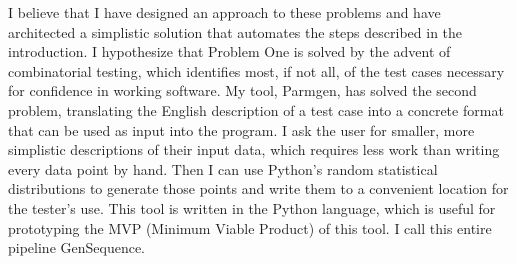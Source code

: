 I believe that I have designed an approach to these problems and have architected a simplistic solution that automates the steps described in the introduction. I hypothesize that Problem One is solved by the advent of combinatorial testing, which identifies most, if not all, of the test cases necessary for confidence in working software. My tool, Parmgen, has solved the second problem, translating the English description of a test case into a concrete format that can be used as input into the program. I ask the user for smaller, more simplistic descriptions of their input data, which requires less work than writing every data point by hand. Then I can use Python's random statistical distributions to generate those points and write them to a convenient location for the tester’s use. This tool is written in the Python language, which is useful for prototyping the MVP (Minimum Viable Product) of this tool. I call this entire pipeline GenSequence.